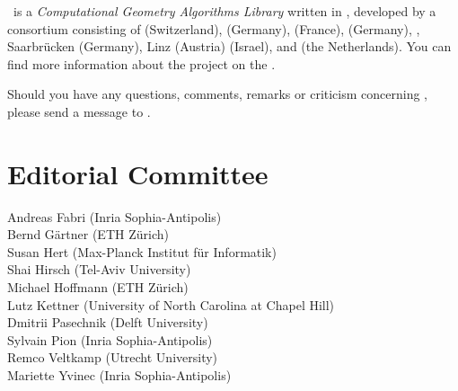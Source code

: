 
\cgal\ is a {\em Computational Geometry Algorithms Library} written in \CC, 
developed by a consortium consisting of
 (Switzerland), 
 (Germany), 
 (France),
 (Germany),
,
Saarbr\"ucken (Germany),
 Linz (Austria)
 (Israel), and
 (the Netherlands). 
You can find more information about the project on the
.


Should you have any questions, comments, remarks or criticism concerning 
\cgal, please send a message to 
.

\section*{Editorial Committee}

Andreas Fabri ({\sc Inria} Sophia-Antipolis) \\
Bernd G\"artner (ETH Z\"urich) \\
Susan Hert (Max-Planck Institut f\"ur Informatik)\\
Shai Hirsch (Tel-Aviv University) \\
Michael Hoffmann (ETH Z\"urich) \\
Lutz Kettner (University of North Carolina at Chapel Hill) \\
Dmitrii Pasechnik (Delft University) \\
Sylvain Pion ({\sc Inria} Sophia-Antipolis)\\
Remco Veltkamp (Utrecht University)\\
Mariette Yvinec ({\sc Inria} Sophia-Antipolis)\\




